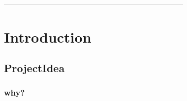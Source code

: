  ------------------------------------------------------------------------------
\chapter{Introduction} %
\section{ProjectIdea} %
\subsection{why?} %



